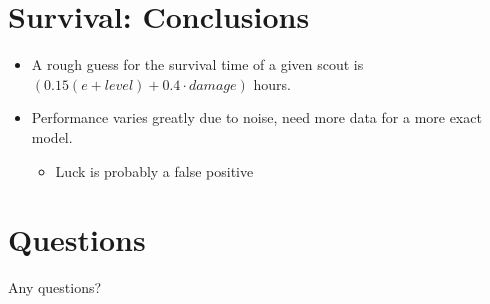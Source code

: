 \documentclass{beamer}
\begin{document}
\section{Survival: Conclusions}
\begin{frame}
  \begin{itemize}
  \item A rough guess for the survival time of a given scout is $(0.15(e+level)+0.4\cdot damage)$ hours.
  \item Performance varies greatly due to noise, need more data for a more exact model.
  \begin{itemize}
  \item Luck is probably a false positive
  \end{itemize}
  \end{itemize}
\end{frame}

\section{Questions}
\begin{frame}
\centering
  
  {\Huge Any questions?}


\end{frame}
\end{document}

